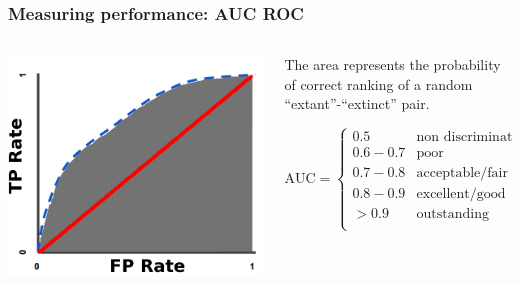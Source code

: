 \documentclass{beamer}
\begin{document}
\begin{frame}
  \frametitle{Measuring performance: AUC ROC}

  \begin{columns}
    \begin{column}{0.4\textwidth}
      \includegraphics[width=\textwidth,height=\textheight,keepaspectratio=true]{figure/AUC}


    \end{column}
    \begin{column}{0.6\textwidth}
      The area represents the probability of correct ranking of a random ``extant''-``extinct'' pair.
      
      \[
        \text{AUC} = 
        \begin{cases} 
          0.5 & \text{non discrimination}\\
          0.6-0.7 & \text{poor} \\
          0.7-0.8 & \text{acceptable/fair} \\
          0.8-0.9 & \text{excellent/good} \\
          > 0.9 & \text{outstanding} \\
        \end{cases}
      \]

    \end{column}
  \end{columns}

\end{frame}
\end{document}
